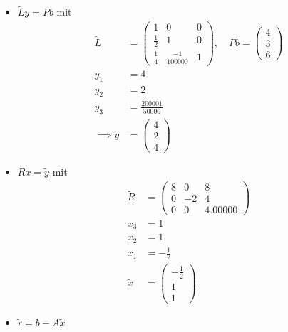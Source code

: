 \documentclass[12pt]{scrartcl}
\begin{document}
\begin{enumAlph}
\begin{itemize}
    
    \item[II.] $\tilde{L}y = Pb$ mit 
        \[
        \begin{aligned}
        \tilde{L} &= \begin{pmatrix}
           1 & 0 & 0 \\
      \frac{1}{2} & 1 & 0 \\
      \frac{1}{4} & \frac{-1}{100 000} & 1
        \end{pmatrix}, \quad
        Pb = \begin{pmatrix}
            4 \\ 3 \\ 6 
        \end{pmatrix}
        \\
        y_1 &= 4 \\
        y_2 &= 2 \\
        y_3 &= \frac{200001}{50000}\\[6pt]
        \implies \tilde{y}&=\begin{pmatrix}
            4 \\ 2 \\ 4
        \end{pmatrix}
        \end{aligned}
        \]

    \item[III.] $\tilde{R}x=\tilde{y}$ mit
        \[
        \begin{aligned}
        \tilde{R} &= \begin{pmatrix}
           8 & 0 & 8 \\
            0 & -2 & 4 \\
            0 & 0 & 4.00000
        \end{pmatrix}
        \\[6pt]
        x_3 &= 1 \\
        x_2 &= 1\\
        x_1 &= -\frac{1}{2}\\[6pt]
        \tilde{x} &=\begin{pmatrix}
            -\frac{1}{2} \\ 1 \\ 1
        \end{pmatrix}
        \end{aligned}
        \]

    \item[IV.] $\tilde{r}=b-A\tilde{x}$


\end{itemize}
\end{enumAlph}
\end{document}
